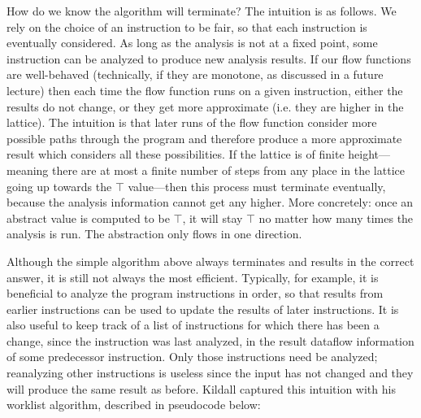 \documentclass[11pt]{article}
\begin{document}
How do we know the algorithm will terminate?  The intuition is as follows.  We
rely on the choice of an instruction to be fair, so that each instruction is
eventually considered.  As long as the analysis is not at a fixed point, some
instruction can be analyzed to produce new analysis results.  If our flow
functions are well-behaved (technically, if they are monotone, as discussed in a
future lecture) then each time the flow function runs on a given instruction,
either the results do not change, or they get more approximate (i.e. they are
higher in the lattice).  The intuition is that later runs of the flow function
consider more possible paths through the program and therefore produce a more
approximate result which considers all these possibilities.  If the lattice is
of finite height---meaning there are at most a finite number of steps from any
place in the lattice going up towards the $\top$ value---then this process must
terminate eventually, because the analysis information cannot get any higher.
More concretely: once an abstract value is computed to be $\top$, it will stay
$\top$ no matter how many times the analysis is run.  The abstraction only flows
in one direction.

Although the simple algorithm above always terminates and results in the correct
answer, it is still not always the most efficient.  Typically, for example, it
is beneficial to analyze the program instructions in order, so that results from
earlier instructions can be used to update the results of later instructions.
It is also useful to keep track of a list of instructions for which there has
been a change, since the instruction was last analyzed, in the result dataflow
information of some predecessor instruction.  Only those instructions need be
analyzed; reanalyzing other instructions is useless since the input has not
changed and they will produce the same result as before.  Kildall captured this
intuition with his worklist algorithm, described in pseudocode below:

%
%	
\end{document}
